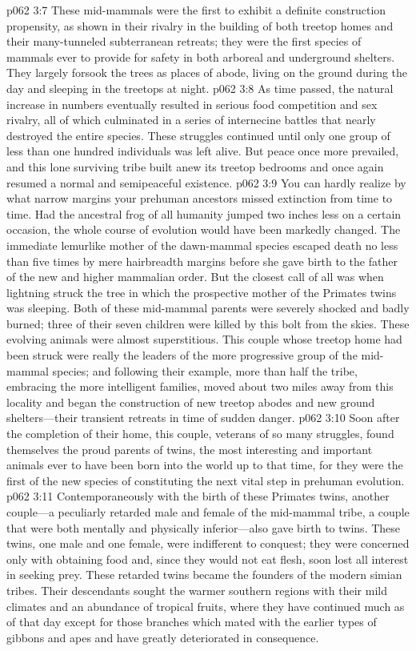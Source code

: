 \vs p062 3:7 These mid\hyp{}mammals were the first to exhibit a definite construction propensity, as shown in their rivalry in the building of both treetop homes and their many\hyp{}tunneled subterranean retreats; they were the first species of mammals ever to provide for safety in both arboreal and underground shelters. They largely forsook the trees as places of abode, living on the ground during the day and sleeping in the treetops at night.
\vs p062 3:8 As time passed, the natural increase in numbers eventually resulted in serious food competition and sex rivalry, all of which culminated in a series of internecine battles that nearly destroyed the entire species. These struggles continued until only one group of less than one hundred individuals was left alive. But peace once more prevailed, and this lone surviving tribe built anew its treetop bedrooms and once again resumed a normal and semipeaceful existence.
\pc \vs p062 3:9 You can hardly realize by what narrow margins your prehuman ancestors missed extinction from time to time. Had the ancestral frog of all humanity jumped two inches less on a certain occasion, the whole course of evolution would have been markedly changed. The immediate lemurlike mother of the dawn\hyp{}mammal species escaped death no less than five times by mere hairbreadth margins before she gave birth to the father of the new and higher mammalian order. But the closest call of all was when lightning struck the tree in which the prospective mother of the Primates twins was sleeping. Both of these mid\hyp{}mammal parents were severely shocked and badly burned; three of their seven children were killed by this bolt from the skies. These evolving animals were almost superstitious. This couple whose treetop home had been struck were really the leaders of the more progressive group of the mid\hyp{}mammal species; and following their example, more than half the tribe, embracing the more intelligent families, moved about two miles away from this locality and began the construction of new treetop abodes and new ground shelters---their transient retreats in time of sudden danger.
\vs p062 3:10 Soon after the completion of their home, this couple, veterans of so many struggles, found themselves the proud parents of twins, the most interesting and important animals ever to have been born into the world up to that time, for they were the first of the new species of  constituting the next vital step in prehuman evolution.
\pc \vs p062 3:11 Contemporaneously with the birth of these Primates twins, another couple---a peculiarly retarded male and female of the mid\hyp{}mammal tribe, a couple that were both mentally and physically inferior---also gave birth to twins. These twins, one male and one female, were indifferent to conquest; they were concerned only with obtaining food and, since they would not eat flesh, soon lost all interest in seeking prey. These retarded twins became the founders of the modern simian tribes. Their descendants sought the warmer southern regions with their mild climates and an abundance of tropical fruits, where they have continued much as of that day except for those branches which mated with the earlier types of gibbons and apes and have greatly deteriorated in consequence.
